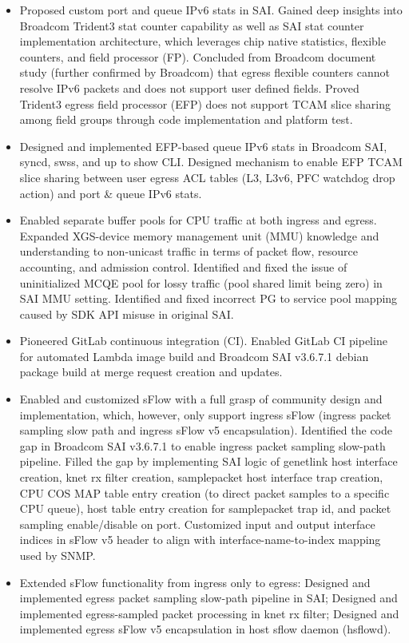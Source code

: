 \documentclass[letterpaper,11pt]{article}
\newcommand{\resitem}[1]{\item #1 \vspace{-2pt}}
\begin{document}
\begin{itemize}
\begin{itemize}
  \resitem{Proposed custom port and queue IPv6 stats in SAI. Gained deep insights into Broadcom Trident3 stat counter capability
  as well as SAI stat counter implementation architecture, which leverages chip native statistics, flexible counters, and field processor (FP).
  Concluded from Broadcom document study (further confirmed by Broadcom) that egress flexible counters cannot resolve IPv6 packets
  and does not support user defined fields.
  Proved Trident3 egress field processor (EFP) does not support TCAM slice sharing among field groups through code implementation and platform test.}
  \resitem{Designed and implemented EFP-based queue IPv6 stats in Broadcom SAI, syncd, swss, and up to show CLI.
  Designed mechanism to enable EFP TCAM slice sharing between user egress ACL tables (L3, L3v6, PFC watchdog drop action)
  and port \& queue IPv6 stats.}
  \resitem{Enabled separate buffer pools for CPU traffic at both ingress and egress. Expanded XGS-device memory management unit (MMU)
  knowledge and understanding to
  non-unicast traffic in terms of packet flow, resource accounting, and admission control.
  Identified and fixed the issue of uninitialized MCQE pool for lossy traffic (pool shared limit being zero) in SAI MMU setting.
  Identified and fixed incorrect PG to service pool mapping caused by SDK API misuse in original SAI.}
  \resitem{Pioneered GitLab continuous integration (CI). Enabled GitLab CI pipeline for automated Lambda image build and Broadcom SAI v3.6.7.1 debian package build
  at merge request creation and updates.}
  \resitem{Enabled and customized sFlow with a full grasp of community design and implementation,
  which, however, only support ingress sFlow (ingress packet sampling slow path and ingress sFlow v5 encapsulation).
  Identified the code gap in Broadcom SAI v3.6.7.1 to enable ingress packet sampling slow-path pipeline.
  Filled the gap by implementing SAI logic of genetlink host interface creation, knet rx filter creation, samplepacket host interface trap creation,
  CPU COS MAP table entry creation (to direct packet samples to a specific CPU queue), host table entry creation for samplepacket trap id,
  and packet sampling enable/disable on port.
  Customized input and output interface indices in sFlow v5 header to align with interface-name-to-index mapping used by SNMP.}
  \resitem{Extended sFlow functionality from ingress only to egress: Designed and implemented egress packet sampling slow-path pipeline in SAI;
  Designed and implemented egress-sampled packet processing in knet rx filter;
  Designed and implemented egress sFlow v5 encapsulation in host sflow daemon (hsflowd).
}
\end{itemize}
\end{itemize}
\end{document}
